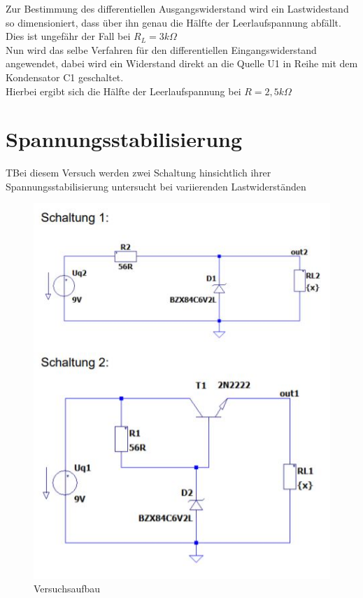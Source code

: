 \documentclass{article}
\begin{document}
Zur Bestimmung des differentiellen Ausgangswiderstand wird ein Lastwidestand so dimensioniert, dass über ihn genau die Hälfte der Leerlaufspannung abfällt.
\\ Dies ist ungefähr der Fall bei $R_L = 3k\Omega$\\
Nun wird das selbe Verfahren für den differentiellen Eingangswiderstand angewendet, dabei wird ein Widerstand direkt an die Quelle U1 in Reihe mit dem Kondensator C1 geschaltet. 
\\ Hierbei ergibt sich die Hälfte der Leerlaufspannung bei $R = 2,5k\Omega$

\newpage

\section{Spannungsstabilisierung}

\begin{task}
  TBei diesem Versuch werden zwei Schaltung hinsichtlich ihrer Spannungsstabilisierung untersucht bei variierenden Lastwiderständen 
\end{task}

\begin{figure}[h]
  \centering
  \includegraphics[scale=0.8]{../assets/images/EL1P3/schaltung 3.JPG}
  \caption{Versuchsaufbau}
\end{figure}
\end{document}
